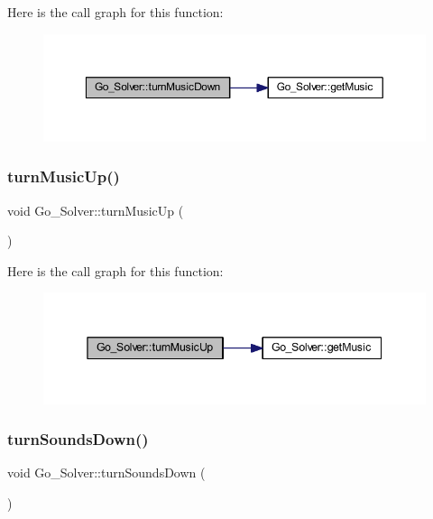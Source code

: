 Here is the call graph for this function\+:
\nopagebreak
\begin{figure}[H]
\begin{center}
\leavevmode
\includegraphics[width=350pt]{class_go___solver_a9bf8a0287fac1692ddf3b640ae1b04fe_cgraph}
\end{center}
\end{figure}
\mbox{\label{class_go___solver_a840b3c44ffd48baf0b7f2b4d15a831a0}} 
\subsubsection{\texorpdfstring{turn\+Music\+Up()}{turnMusicUp()}}
{\footnotesize\ttfamily void Go\+\_\+\+Solver\+::turn\+Music\+Up (\begin{DoxyParamCaption}{ }\end{DoxyParamCaption})}

Here is the call graph for this function\+:
\nopagebreak
\begin{figure}[H]
\begin{center}
\leavevmode
\includegraphics[width=345pt]{class_go___solver_a840b3c44ffd48baf0b7f2b4d15a831a0_cgraph}
\end{center}
\end{figure}
\mbox{\label{class_go___solver_a1d7d0fad019f2d33caebb6cfe11d1f42}} 
\subsubsection{\texorpdfstring{turn\+Sounds\+Down()}{turnSoundsDown()}}
{\footnotesize\ttfamily void Go\+\_\+\+Solver\+::turn\+Sounds\+Down (\begin{DoxyParamCaption}{ }\end{DoxyParamCaption})}

